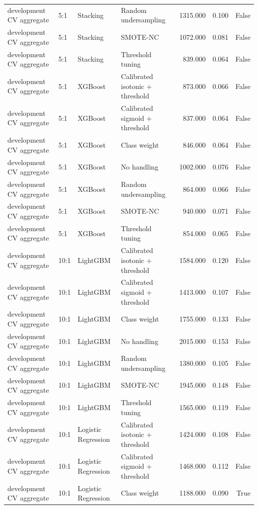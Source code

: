 \begin{tabular}{llllrrr}
development CV aggregate & 5:1 & Stacking & Random undersampling & 1315.000 & 0.100 & False \\
development CV aggregate & 5:1 & Stacking & SMOTE-NC & 1072.000 & 0.081 & False \\
development CV aggregate & 5:1 & Stacking & Threshold tuning & 839.000 & 0.064 & False \\
development CV aggregate & 5:1 & XGBoost & Calibrated isotonic + threshold & 873.000 & 0.066 & False \\
development CV aggregate & 5:1 & XGBoost & Calibrated sigmoid + threshold & 837.000 & 0.064 & False \\
development CV aggregate & 5:1 & XGBoost & Class weight & 846.000 & 0.064 & False \\
development CV aggregate & 5:1 & XGBoost & No handling & 1002.000 & 0.076 & False \\
development CV aggregate & 5:1 & XGBoost & Random undersampling & 864.000 & 0.066 & False \\
development CV aggregate & 5:1 & XGBoost & SMOTE-NC & 940.000 & 0.071 & False \\
development CV aggregate & 5:1 & XGBoost & Threshold tuning & 854.000 & 0.065 & False \\
development CV aggregate & 10:1 & LightGBM & Calibrated isotonic + threshold & 1584.000 & 0.120 & False \\
development CV aggregate & 10:1 & LightGBM & Calibrated sigmoid + threshold & 1413.000 & 0.107 & False \\
development CV aggregate & 10:1 & LightGBM & Class weight & 1755.000 & 0.133 & False \\
development CV aggregate & 10:1 & LightGBM & No handling & 2015.000 & 0.153 & False \\
development CV aggregate & 10:1 & LightGBM & Random undersampling & 1380.000 & 0.105 & False \\
development CV aggregate & 10:1 & LightGBM & SMOTE-NC & 1945.000 & 0.148 & False \\
development CV aggregate & 10:1 & LightGBM & Threshold tuning & 1565.000 & 0.119 & False \\
development CV aggregate & 10:1 & Logistic Regression & Calibrated isotonic + threshold & 1424.000 & 0.108 & False \\
development CV aggregate & 10:1 & Logistic Regression & Calibrated sigmoid + threshold & 1468.000 & 0.112 & False \\
development CV aggregate & 10:1 & Logistic Regression & Class weight & 1188.000 & 0.090 & True \\

\end{tabular}
